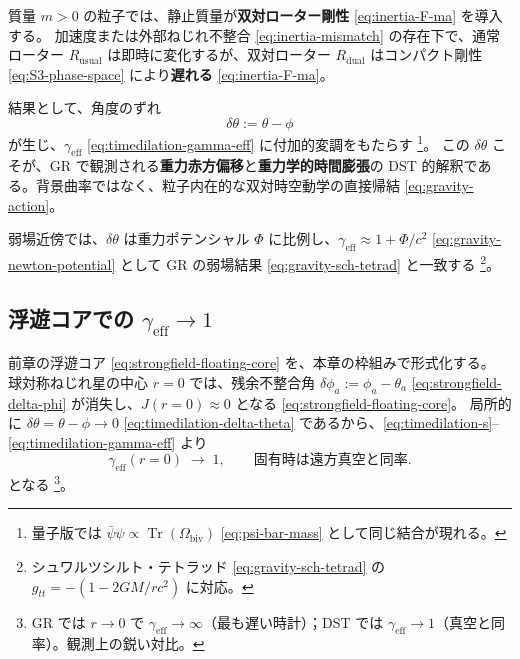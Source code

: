 \documentclass[dvipdfmx,a4paper,oneside]{jsbook}
\numberwithin{equation}{chapter}
\begin{document}
質量 \(m > 0\) の粒子では、静止質量が\textbf{双対ローター剛性} \eqref{eq:inertia-F-ma} を導入する。
加速度または外部ねじれ不整合 \eqref{eq:inertia-mismatch} の存在下で、通常ローター \(R_{\mathrm{usual}}\) は即時に変化するが、双対ローター \(R_{\mathrm{dual}}\) はコンパクト剛性 \eqref{eq:S3-phase-space} により\textbf{遅れる} \eqref{eq:inertia-F-ma}。

結果として、角度のずれ
\begin{equation}
  \delta\theta := \theta - \phi
  \label{eq:timedilation-delta-theta}
\end{equation}
が生じ、\(\gamma_{\mathrm{eff}}\) \eqref{eq:timedilation-gamma-eff} に付加的変調をもたらす \footnote{量子版では \(\bar\psi\psi \propto \operatorname{Tr}(\Omega_{\mathrm{biv}})\) \eqref{eq:psi-bar-mass} として同じ結合が現れる。}。
この \(\delta\theta\) こそが、GR で観測される\textbf{重力赤方偏移}と\textbf{重力学的時間膨張}の DST 的解釈である。背景曲率ではなく、粒子内在的な双対時空動学の直接帰結 \eqref{eq:gravity-action}。

弱場近傍では、\(\delta\theta\) は重力ポテンシャル \(\Phi\) に比例し、\(\gamma_{\mathrm{eff}} \approx 1 + \Phi/c^2\) \eqref{eq:gravity-newton-potential} として GR の弱場結果 \eqref{eq:gravity-sch-tetrad} と一致する \footnote{シュワルツシルト・テトラッド \eqref{eq:gravity-sch-tetrad} の \(g_{tt} = -(1 - 2GM/rc^2)\) に対応。}。

\subsection{浮遊コアでの \(\gamma_{\mathrm{eff}} \to 1\)}

前章の浮遊コア \eqref{eq:strongfield-floating-core} を、本章の枠組みで形式化する。
球対称ねじれ星の中心 \(r = 0\) では、残余不整合角 \(\delta\phi_a := \phi_a - \theta_a\) \eqref{eq:strongfield-delta-phi} が消失し、\(J(r = 0) \approx 0\) となる \eqref{eq:strongfield-floating-core}。
局所的に \(\delta\theta = \theta - \phi \to 0\) \eqref{eq:timedilation-delta-theta} であるから、\eqref{eq:timedilation-s}–\eqref{eq:timedilation-gamma-eff} より
\begin{equation}
  \boxed{\;
  \gamma_{\mathrm{eff}}(r = 0) \;\to\; 1,
  \qquad
  \text{固有時は遠方真空と同率}.
  \;}
  \label{eq:timedilation-floating-core}
\end{equation}
となる \footnote{GR では \(r \to 0\) で \(\gamma_{\mathrm{eff}} \to \infty\)（最も遅い時計）；DST では \(\gamma_{\mathrm{eff}} \to 1\)（真空と同率）。観測上の鋭い対比。}。
\end{document}
